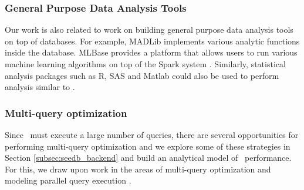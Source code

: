 \subsubsection*{General Purpose Data Analysis Tools}
Our work is also related to work on building general purpose data analysis tools
on top of databases. For example, MADLib \cite{DBLP:conf/VLDB/HellersteinRSWF12}
implements various analytic functions inside the database. MLBase
\cite{DBLP:conf/CIDR/KraskaTDGFJ2013} provides a platform that allows users to
run various machine learning algorithms on top of the Spark system
\cite{DBLP:conf/SCC/ZahariaCFSS10}.
Similarly, statistical analysis packages such as R, SAS and Matlab could also be
used to perform analysis similar to \SeeDB.


\subsubsection*{Multi-query optimization}
Since \SeeDB\ must execute a large number of queries, there are several
opportunities for performing multi-query optimization and we explore some of
these strategies in Section \ref{subsec:seedb_backend} and build an analytical model of
\SeeDB\ performance. For this, we draw upon work in the areas of multi-query
optimization and modeling parallel query execution \cite{DBLP:conf/VLDB/WuCHN13,
DBLP:journal/TODS/Sellis1988, DBLP:conf/VLDB/ZukowskiHNB07}.



